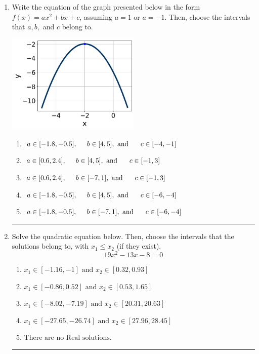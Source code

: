 \documentclass[14pt]{extbook}
\newcommand{\litem}[1]{\item#1\hspace*{-1cm}\rule{\textwidth}{0.4pt}}
\begin{document}
\begin{enumerate}
{\begin{enumerate}[label=\Alph*.]
\end{enumerate} }
\litem{
Write the equation of the graph presented below in the form $f(x)=ax^2+bx+c$, assuming  $a=1$ or $a=-1$. Then, choose the intervals that $a, b,$ and $c$ belong to.
\begin{center}
    \includegraphics[width=0.5\textwidth]{../Figures/quadraticGraphToEquationCopyA.png}
\end{center}
\begin{enumerate}[label=\Alph*.]
\item \( a \in [-1.8, -0.5], \hspace*{5mm} b \in [4, 5], \text{ and } \hspace*{5mm} c \in [-4, -1] \)
\item \( a \in [0.6, 2.4], \hspace*{5mm} b \in [4, 5], \text{ and } \hspace*{5mm} c \in [-1, 3] \)
\item \( a \in [0.6, 2.4], \hspace*{5mm} b \in [-7, 1], \text{ and } \hspace*{5mm} c \in [-1, 3] \)
\item \( a \in [-1.8, -0.5], \hspace*{5mm} b \in [4, 5], \text{ and } \hspace*{5mm} c \in [-6, -4] \)
\item \( a \in [-1.8, -0.5], \hspace*{5mm} b \in [-7, 1], \text{ and } \hspace*{5mm} c \in [-6, -4] \)

\end{enumerate} }
\litem{
Solve the quadratic equation below. Then, choose the intervals that the solutions belong to, with $x_1 \leq x_2$ (if they exist).\[ 19x^{2} -13 x -8 = 0 \]\begin{enumerate}[label=\Alph*.]
\item \( x_1 \in [-1.16, -1] \text{ and } x_2 \in [0.32, 0.93] \)
\item \( x_1 \in [-0.86, 0.52] \text{ and } x_2 \in [0.53, 1.65] \)
\item \( x_1 \in [-8.02, -7.19] \text{ and } x_2 \in [20.31, 20.63] \)
\item \( x_1 \in [-27.65, -26.74] \text{ and } x_2 \in [27.96, 28.45] \)
\item \( \text{There are no Real solutions.} \)


\end{enumerate}}
\end{enumerate}
\end{document}
